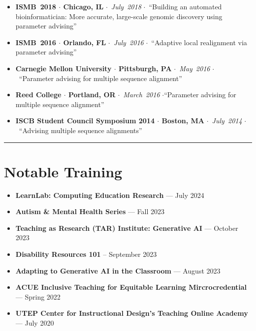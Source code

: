 \documentclass[10pt,letterpaper]{article}
\newcommand{\bigdot}{$\cdot$\xspace}
\newcommand{\cvsection}[1]{%
    \par\vspace{10pt}%
  \noindent\rule{\linewidth}{0.4pt}\par
  \vspace{-5.5ex}%
  \section*{#1}%
}
\begin{document}
\begin{itemize}
    \item \textbf{ISMB~2018 \bigdot Chicago, IL} \bigdot~\textit{July~2018} \bigdot~``Building an automated bioinformatician: More accurate, large-scale genomic discovery using parameter advising''
    \item \textbf{ISMB~2016 \bigdot Orlando, FL} \bigdot~\textit{July~2016} \bigdot~``Adaptive local realignment via parameter advising'' 
    \item \textbf{Carnegie Mellon University \bigdot Pittsburgh, PA} \bigdot~\textit{May~2016} \bigdot~``Parameter advising for multiple sequence alignment''
    \item \textbf{Reed College \bigdot Portland, OR} \bigdot~\textit{March~2016} \bigdot ``Parameter advising for multiple sequence alignment''
    \item \textbf{ISCB Student Council Symposium 2014 \bigdot  Boston, MA} \bigdot~\textit{July~2014} \bigdot~``Advising multiple sequence alignments''
   
\end{itemize}

\cvsection{Notable Training}
\begin{itemize}
\item\textbf{LearnLab: Computing Education Research} --- July 2024
\item\textbf{Autism \& Mental Health Series} --- Fall 2023
\item\textbf{Teaching as Research (TAR) Institute: Generative AI} --- October 2023
\item\textbf{Disability Resources 101} -- September 2023
\item\textbf{Adapting to Generative AI in the Classroom} --- August 2023
\item\textbf{ACUE Inclusive Teaching for Equitable Learning Mircrocredential} --- Spring 2022 
\item\textbf{UTEP Center for Instructional Design's Teaching Online Academy} --- July 2020
\end{itemize}

\end{document}
